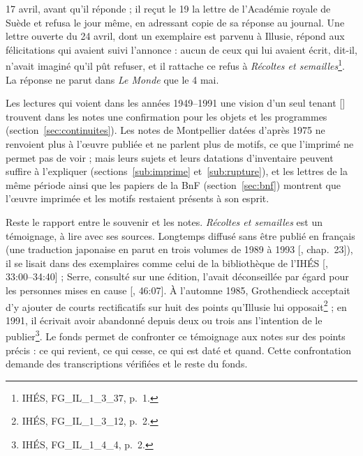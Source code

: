 \documentclass[11pt]{amsart}
\newcommand{\ts}[1]{\foreignlanguage{english}{#1}}
\begin{document}
17 avril, avant qu'il réponde ; il reçut le 19 la lettre de l'Académie royale de Suède et refusa le jour même, en adressant copie de sa réponse au journal. Une lettre ouverte du 24 avril, dont un exemplaire est parvenu à Illusie, répond aux félicitations qui avaient suivi l'annonce : aucun de ceux qui lui avaient écrit, dit-il, n'avait imaginé qu'il pût refuser, et il rattache ce refus à \emph{Récoltes et semailles}\footnote{IHÉS, FG\_IL\_1\_3\_37, p.~1.}. La réponse ne parut dans \emph{Le Monde} que le 4 mai.

Les lectures qui voient dans les années 1949--1991 une vision d'un seul tenant [\citealp{zalamea2025}] trouvent dans les notes une confirmation pour les objets et les programmes (section~\ref{sec:continuites}). Les notes de Montpellier datées d'après 1975 ne renvoient plus à l'œuvre publiée et ne parlent plus de motifs, ce que l'imprimé ne permet pas de voir ; mais leurs sujets et leurs datations d'inventaire peuvent suffire à l'expliquer (sections~\ref{sub:imprime} et~\ref{sub:rupture}), et les lettres de la même période ainsi que les papiers de la BnF (section~\ref{sec:bnf}) montrent que l'œuvre imprimée et les motifs restaient présents à son esprit.

Reste le rapport entre le souvenir et les notes. \emph{Récoltes et semailles} est un témoignage, à lire avec ses sources. Longtemps diffusé sans être publié en français (une traduction japonaise en parut en trois volumes de 1989 à 1993 [\citealp{circle-spirit}, chap.~23]), il se lisait dans des exemplaires comme celui de la bibliothèque de l'IHÉS [\citealp{connes2026}, \ts{33:00--34:40}] ; Serre, consulté sur une édition, l'avait déconseillée par égard pour les personnes mises en cause [\citealp{serreconnes2019}, \ts{46:07}]. À l'automne 1985, Grothendieck acceptait d'y ajouter de courts rectificatifs sur huit des points qu'Illusie lui opposait\footnote{IHÉS, FG\_IL\_1\_3\_12, p.~2.} ; en 1991, il écrivait avoir abandonné depuis deux ou trois ans l'intention de le publier\footnote{IHÉS, FG\_IL\_1\_4\_4, p.~2.}. Le fonds permet de confronter ce témoignage aux notes sur des points précis : ce qui revient, ce qui cesse, ce qui est daté et quand. Cette confrontation demande des transcriptions vérifiées et le reste du fonds.
\end{document}
